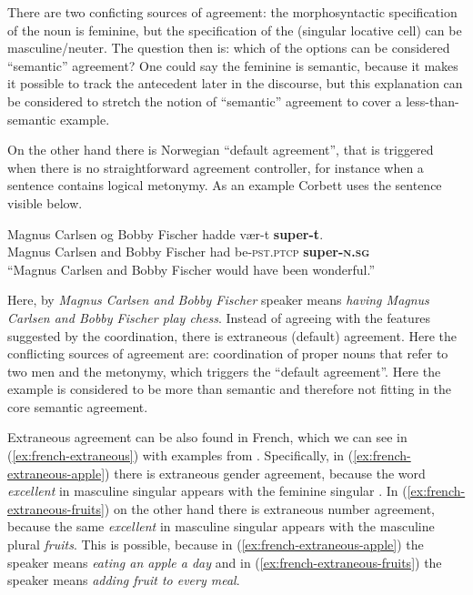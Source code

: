 There are two conficting sources of agreement: the morphosyntactic specification of the noun is feminine, but the specification of the (singular locative cell) can be masculine/neuter. The question then is: which of the options can be considered ``semantic'' agreement? One could say the feminine is semantic, because it makes it possible to track the antecedent later in the discourse, but this explanation can be considered to stretch the notion of ``semantic'' agreement to cover a less-than-semantic example.

On the other hand there is Norwegian ``default agreement'', that is triggered when there is no straightforward agreement controller, for instance when a sentence contains logical metonymy. As an example Corbett uses the sentence visible below.

\begin{exe}
  \ex\label{ex:norwegian-pancake}
  \gll Magnus Carlsen og Bobby Fischer hadde vær-t \textbf{super-t}.\\
  Magnus Carlsen and Bobby Fischer had be\textsc{-pst.ptcp} \textbf{super\textsc{-n.sg}}\\
  \glt ``Magnus Carlsen and Bobby Fischer would have been wonderful.''
\end{exe}

Here, by \textsl{Magnus Carlsen and Bobby Fischer} speaker means \textsl{having Magnus Carlsen and Bobby Fischer play chess}. Instead of agreeing with the features suggested by the coordination, there is extraneous (default) agreement. Here the conflicting sources of agreement are: coordination of proper nouns that refer to two men and the metonymy, which triggers the ``default agreement''. Here the example is considered to be more than semantic and therefore not fitting in the core semantic agreement.

Extraneous agreement can be also found in French, which we can see in (\ref{ex:french-extraneous}) with examples from \cite{ggf}. Specifically, in (\ref{ex:french-extraneous-apple}) there is extraneous gender agreement, because the word \textsl{excellent} in masculine singular appears with the feminine singular . In (\ref{ex:french-extraneous-fruits}) on the other hand there is extraneous number agreement, because the same \textsl{excellent} in masculine singular appears with the masculine plural \textsl{fruits}. This is possible, because in (\ref{ex:french-extraneous-apple}) the speaker means \textsl{eating an apple a day} and in (\ref{ex:french-extraneous-fruits}) the speaker means \textsl{adding fruit to every meal}.

